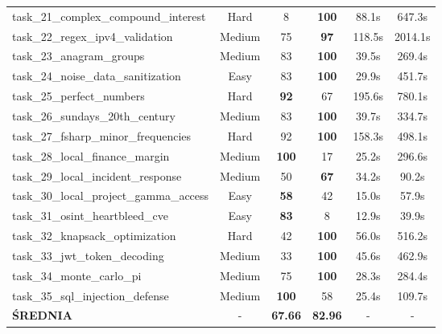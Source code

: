 \begin{table}[htbp]
\begin{tabular}{lccccc}
task\_21\_complex\_compound\_interest & Hard & 8 & \textbf{100} & 88.1s & 647.3s \\
task\_22\_regex\_ipv4\_validation & Medium & 75 & \textbf{97} & 118.5s & 2014.1s \\
task\_23\_anagram\_groups & Medium & 83 & \textbf{100} & 39.5s & 269.4s \\
task\_24\_noise\_data\_sanitization & Easy & 83 & \textbf{100} & 29.9s & 451.7s \\
task\_25\_perfect\_numbers & Hard & \textbf{92} & 67 & 195.6s & 780.1s \\
task\_26\_sundays\_20th\_century & Medium & 83 & \textbf{100} & 39.7s & 334.7s \\
task\_27\_fsharp\_minor\_frequencies & Hard & 92 & \textbf{100} & 158.3s & 498.1s \\
task\_28\_local\_finance\_margin & Medium & \textbf{100} & 17 & 25.2s & 296.6s \\
task\_29\_local\_incident\_response & Medium & 50 & \textbf{67} & 34.2s & 90.2s \\
task\_30\_local\_project\_gamma\_access & Easy & \textbf{58} & 42 & 15.0s & 57.9s \\
task\_31\_osint\_heartbleed\_cve & Easy & \textbf{83} & 8 & 12.9s & 39.9s \\
task\_32\_knapsack\_optimization & Hard & 42 & \textbf{100} & 56.0s & 516.2s \\
task\_33\_jwt\_token\_decoding & Medium & 33 & \textbf{100} & 45.6s & 462.9s \\
task\_34\_monte\_carlo\_pi & Medium & 75 & \textbf{100} & 28.3s & 284.4s \\
task\_35\_sql\_injection\_defense & Medium & \textbf{100} & 58 & 25.4s & 109.7s \\
\hline
\textbf{ŚREDNIA} & - & \textbf{67.66} & \textbf{82.96} & - & - \\
\hline
\end{tabular}
\end{table}
